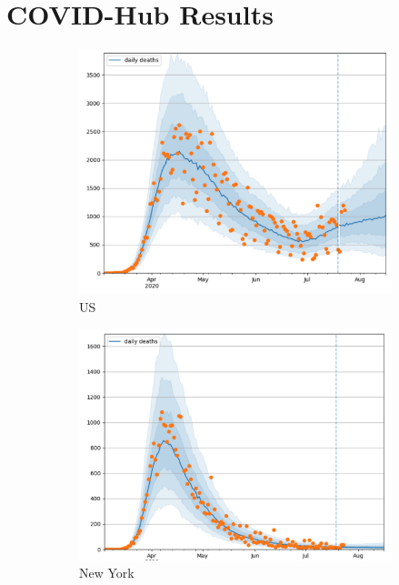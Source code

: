 \documentclass[11pt]{amsart}
\begin{document}
\section{COVID-Hub Results}


\begin{figure}
  \centering
     \begin{subfigure}{.5\textwidth}
  \centering
    \includegraphics[scale=.3]{US.png}
    \caption{US}
\end{subfigure}%
\begin{subfigure}{.5\textwidth}
  \centering
    \includegraphics[scale=.3]{NY.png}
    \caption{New York}
\end{subfigure}
\begin{subfigure}{.5\textwidth}

\end{subfigure}
\end{figure}
\end{document}
